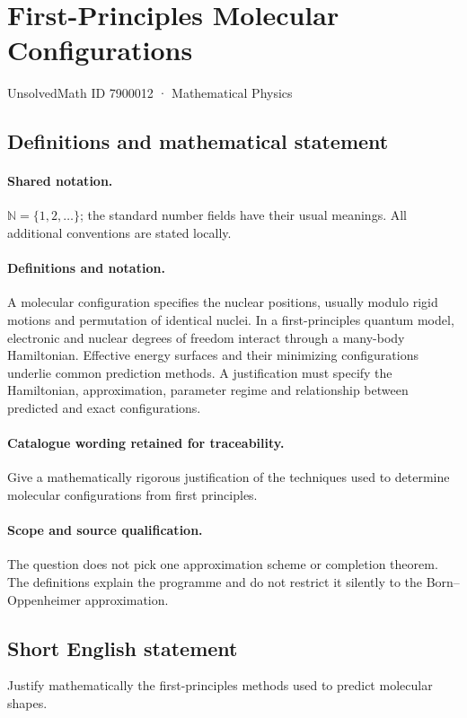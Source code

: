 \documentclass[11pt]{article}
\begin{document}
\setcounter{section}{7900011}
\section{First-Principles Molecular Configurations}\label{7900012}
{\small UnsolvedMath ID 7900012 · Mathematical Physics}
\subsection{Definitions and mathematical statement}

\paragraph{Shared notation.}$\mathbb N=\{1,2,\ldots\}$; the standard number fields have their usual meanings. All additional conventions are stated locally.


\paragraph{Definitions and notation.}A molecular configuration specifies the nuclear positions, usually modulo rigid motions and permutation of identical nuclei. In a first-principles quantum model, electronic and nuclear degrees of freedom interact through a many-body Hamiltonian. Effective energy surfaces and their minimizing configurations underlie common prediction methods. A justification must specify the Hamiltonian, approximation, parameter regime and relationship between predicted and exact configurations.

\paragraph{Catalogue wording retained for traceability.}
Give a mathematically rigorous justification of the techniques used to determine molecular configurations from first principles.
\paragraph{Scope and source qualification.}The question does not pick one approximation scheme or completion theorem. The definitions explain the programme and do not restrict it silently to the Born--Oppenheimer approximation.
\subsection{Short English statement}
Justify mathematically the first-principles methods used to predict molecular shapes.
\end{document}
